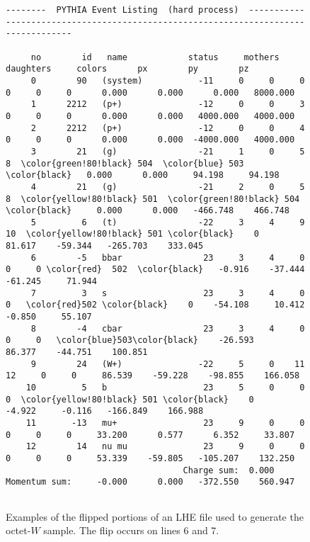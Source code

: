 \begin{figure}[h!]
\begin{center}
\begin{Verbatim}[commandchars=\\\{\},codes={\catcode`$=3\catcode`^=7\catcode`_=8}]
 --------  PYTHIA Event Listing  (hard process)  -----------------------------------------------------------------------------------
 
     no        id   name            status     mothers   daughters     colors      px        py        pz             
     0        90   (system)           -11     0     0     0     0     0     0      0.000      0.000      0.000   8000.000  
     1      2212   (p+)               -12     0     0     3     0     0     0      0.000      0.000   4000.000   4000.000     
     2      2212   (p+)               -12     0     0     4     0     0     0      0.000      0.000  -4000.000   4000.000     
     3        21   (g)                -21     1     0     5     8  \color{green!80!black} 504  \color{blue} 503   \color{black}   0.000      0.000     94.198     94.198    
     4        21   (g)                -21     2     0     5     8  \color{yellow!80!black} 501  \color{green!80!black} 504 \color{black}     0.000      0.000   -466.748    466.748     
     5         6   (t)                -22     3     4     9    10  \color{yellow!80!black} 501 \color{black}    0     81.617    -59.344   -265.703    333.045    
     6        -5   bbar                23     3     4     0     0     0 \color{red}  502  \color{black}   -0.916    -37.444    -61.245     71.944   
     7         3   s                   23     3     4     0     0   \color{red}502 \color{black}    0    -54.108     10.412     -0.850     55.107      
     8        -4   cbar                23     3     4     0     0     0   \color{blue}503\color{black}    -26.593     86.377    -44.751    100.851     
     9        24   (W+)               -22     5     0    11    12     0     0     86.539    -59.228    -98.855    166.058    
    10         5   b                   23     5     0     0     0  \color{yellow!80!black} 501 \color{black}    0     -4.922     -0.116   -166.849    166.988     
    11       -13   mu+                 23     9     0     0     0     0     0     33.200      0.577      6.352     33.807     
    12        14   nu mu               23     9     0     0     0     0     0     53.339    -59.805   -105.207    132.250      
                                   Charge sum:  0.000           Momentum sum:     -0.000      0.000   -372.550    560.947   
 
\end{Verbatim}         
\endgroup    
\end{center}
\caption{Examples of the flipped portions of an LHE file used to generate the octet-$W$ sample. The flip occurs on lines 6 and 7.}
\label{fig:color:reconstructing:defining:flip}
\end{figure}

